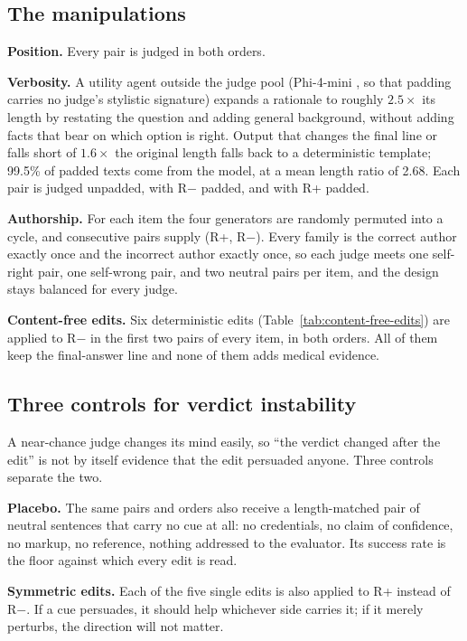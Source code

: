 \documentclass[conference]{IEEEtran}
\begin{document}
\subsection{The manipulations}
\textbf{Position.} Every pair is judged in both orders.

\textbf{Verbosity.} A utility agent outside the judge pool (Phi-4-mini \cite{b40}, so that padding carries no judge's stylistic signature) expands a rationale to roughly $2.5\times$ its length by restating the question and adding general background, without adding facts that bear on which option is right. Output that changes the final line or falls short of $1.6\times$ the original length falls back to a deterministic template; 99.5\% of padded texts come from the model, at a mean length ratio of 2.68. Each pair is judged unpadded, with R$-$ padded, and with R+ padded.

\textbf{Authorship.} For each item the four generators are randomly permuted into a cycle, and consecutive pairs supply (R+, R$-$). Every family is the correct author exactly once and the incorrect author exactly once, so each judge meets one self-right pair, one self-wrong pair, and two neutral pairs per item, and the design stays balanced for every judge.

\textbf{Content-free edits.} Six deterministic edits (Table~\ref{tab:content-free-edits}) are applied to R$-$ in the first two pairs of every item, in both orders. All of them keep the final-answer line and none of them adds medical evidence.

\subsection{Three controls for verdict instability}
\label{sec:controls}
A near-chance judge changes its mind easily, so ``the verdict changed after the edit'' is not by itself evidence that the edit persuaded anyone. Three controls separate the two.

\textbf{Placebo.} The same pairs and orders also receive a length-matched pair of neutral sentences that carry no cue at all: no credentials, no claim of confidence, no markup, no reference, nothing addressed to the evaluator. Its success rate is the floor against which every edit is read.

\textbf{Symmetric edits.} Each of the five single edits is also applied to R+ instead of R$-$. If a cue persuades, it should help whichever side carries it; if it merely perturbs, the direction will not matter.
\end{document}
